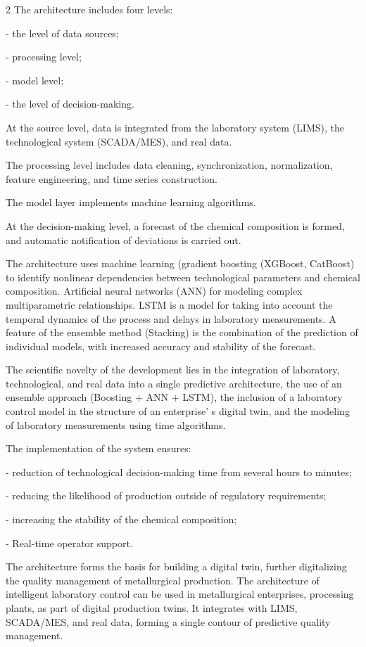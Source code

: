 \begin{multicols}{2}
The architecture includes four levels:

- the level of data sources;

- processing level;

- model level;

- the level of decision-making.

At the source level, data is integrated from the laboratory system
(LIMS), the technological system (SCADA/MES), and real data.

The processing level includes data cleaning, synchronization,
normalization, feature engineering, and time series construction.

The model layer implements machine learning algorithms.

At the decision-making level, a forecast of the chemical composition is
formed, and automatic notification of deviations is carried out.

The architecture uses machine learning (gradient boosting (XGBoost,
CatBoost) to identify nonlinear dependencies between technological
parameters and chemical composition. Artificial neural networks (ANN)
for modeling complex multiparametric relationships. LSTM is a model for
taking into account the temporal dynamics of the process and delays in
laboratory measurements. A feature of the ensemble method (Stacking) is
the combination of the prediction of individual models, with increased
accuracy and stability of the forecast.

The scientific novelty of the development lies in the integration of
laboratory, technological, and real data into a single predictive
architecture, the use of an ensemble approach (Boosting + ANN + LSTM),
the inclusion of a laboratory control model in the structure of an
enterprise' s digital twin, and the modeling of
laboratory measurements using time algorithms.

The implementation of the system ensures:

- reduction of technological decision-making time from several hours to
minutes;

- reducing the likelihood of production outside of regulatory
requirements;

- increasing the stability of the chemical composition;

- Real-time operator support.

The architecture forms the basis for building a digital twin, further
digitalizing the quality management of metallurgical production. The
architecture of intelligent laboratory control can be used in
metallurgical enterprises, processing plants, as part of digital
production twins. It integrates with LIMS, SCADA/MES, and real data,
forming a single contour of predictive quality management.


\end{multicols}
